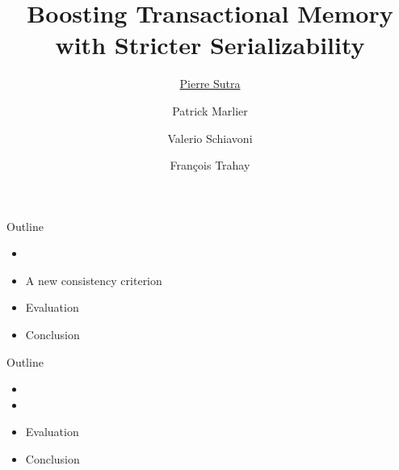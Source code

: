 \documentclass[usenames,dvipsnames]{beamer}
\title[COORDINATION'18]{Boosting Transactional Memory with Stricter Serializability}
\author[P. Sutra ~/~ Boosting TM]{\underline{Pierre Sutra} \and Patrick Marlier\\ \and  Valerio Schiavoni \and Fran\c{c}ois Trahay}
\date{}
\begin{document}
 
\frame{\titlepage}



\begin{frame}[styleplan]{Outline}
  \begin{itemize}
  \item {\color{gray}{Introduction}}
  \item A new consistency criterion
  \item Evaluation
  \item Conclusion
  \end{itemize}
\end{frame}



\begin{frame}[styleplan]{Outline}
  \begin{itemize}
  \item {\color{gray}{Introduction}}
  \item {\color{gray}{A new consistency criterion}}
  \item Evaluation
  \item Conclusion
  \end{itemize}
\end{frame}




\end{document}
